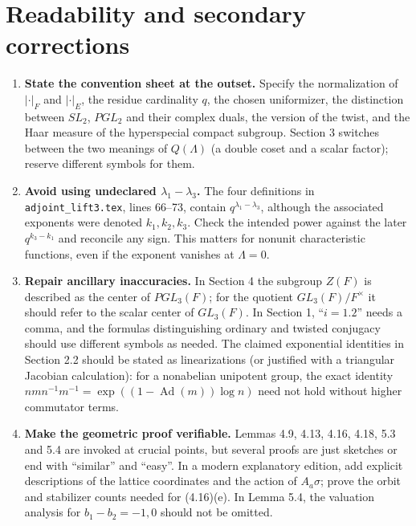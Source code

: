 \documentclass[12pt,letterpaper]{article}
\begin{document}
\section{Readability and secondary corrections}

\begin{enumerate}[label=\arabic*.]
\item \textbf{State the convention sheet at the outset.} Specify the
normalization of $|\cdot|_F$ and $|\cdot|_E$, the residue cardinality
$q$, the chosen uniformizer, the distinction between $SL_2$, $PGL_2$
and their complex duals, the version of the twist, and the Haar
measure of the hyperspecial compact subgroup. Section 3 switches
between the two meanings of $Q(\Lambda)$ (a double coset and a
scalar factor); reserve different symbols for them.

\item \textbf{Avoid using undeclared $\lambda_1-\lambda_3$.}
The four definitions in \texttt{adjoint\_lift3.tex}, lines 66--73,
contain $q^{\lambda_1-\lambda_3}$, although the associated exponents
were denoted $k_1,k_2,k_3$. Check the intended power against the later
$q^{k_3-k_1}$ and reconcile any sign. This matters for nonunit
characteristic functions, even if the exponent vanishes at $\Lambda=0$.

\item \textbf{Repair ancillary inaccuracies.} In Section 4 the subgroup
$Z(F)$ is described as the center of $PGL_3(F)$; for the quotient
$GL_3(F)/F^\times$ it should refer to the scalar center of $GL_3(F)$.
In Section 1, ``$i=1.2$'' needs a comma, and the formulas distinguishing
ordinary and twisted conjugacy should use different symbols as needed.
The claimed exponential identities in Section 2.2 should be stated as
linearizations (or justified with a triangular Jacobian calculation):
for a nonabelian unipotent group, the exact identity
$nmn^{-1}m^{-1}=\exp((1-\operatorname{Ad}(m))\log n)$ need not hold
without higher commutator terms.

\item \textbf{Make the geometric proof verifiable.} Lemmas 4.9, 4.13,
4.16, 4.18, 5.3 and 5.4 are invoked at crucial points, but several
proofs are just sketches or end with ``similar'' and ``easy''.
In a modern explanatory edition, add explicit descriptions of the
lattice coordinates and the action of $A_a\sigma$; prove the orbit and
stabilizer counts needed for (4.16)(e). In Lemma 5.4, the valuation
analysis for $b_1-b_2=-1,0$ should not be omitted.


\end{enumerate}
\end{document}
